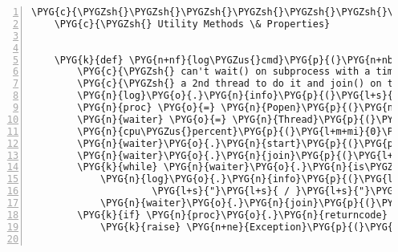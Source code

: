 \begin{Verbatim}[commandchars=\\\{\},numbers=left,firstnumber=1,stepnumber=5]
    \PYG{c}{\PYGZsh{}\PYGZsh{}\PYGZsh{}\PYGZsh{}\PYGZsh{}\PYGZsh{}\PYGZsh{}\PYGZsh{}\PYGZsh{}\PYGZsh{}\PYGZsh{}\PYGZsh{}\PYGZsh{}\PYGZsh{}\PYGZsh{}\PYGZsh{}\PYGZsh{}\PYGZsh{}\PYGZsh{}\PYGZsh{}\PYGZsh{}\PYGZsh{}\PYGZsh{}\PYGZsh{}\PYGZsh{}\PYGZsh{}\PYGZsh{}\PYGZsh{}\PYGZsh{}\PYGZsh{}\PYGZsh{}\PYGZsh{}\PYGZsh{}\PYGZsh{}\PYGZsh{}\PYGZsh{}\PYGZsh{}\PYGZsh{}\PYGZsh{}\PYGZsh{}\PYGZsh{}\PYGZsh{}\PYGZsh{}\PYGZsh{}\PYGZsh{}\PYGZsh{}\PYGZsh{}\PYGZsh{}\PYGZsh{}\PYGZsh{}\PYGZsh{}\PYGZsh{}\PYGZsh{}\PYGZsh{}\PYGZsh{}\PYGZsh{}\PYGZsh{}\PYGZsh{}\PYGZsh{}\PYGZsh{}\PYGZsh{}\PYGZsh{}\PYGZsh{}\PYGZsh{}\PYGZsh{}\PYGZsh{}\PYGZsh{}\PYGZsh{}\PYGZsh{}\PYGZsh{}\PYGZsh{}\PYGZsh{}\PYGZsh{}\PYGZsh{}\PYGZsh{}\PYGZsh{}}
    \PYG{c}{\PYGZsh{} Utility Methods \& Properties}


    \PYG{k}{def} \PYG{n+nf}{log\PYGZus{}cmd}\PYG{p}{(}\PYG{n+nb+bp}{self}\PYG{p}{,} \PYG{o}{*}\PYG{n}{cmd}\PYG{p}{)}\PYG{p}{:}
        \PYG{c}{\PYGZsh{} can't wait() on subprocess with a timeout, alas start up}
        \PYG{c}{\PYGZsh{} a 2nd thread to do it and join() on that one with a timeout}
        \PYG{n}{log}\PYG{o}{.}\PYG{n}{info}\PYG{p}{(}\PYG{l+s}{"}\PYG{l+s}{forking subprocess: \PYGZdl{} }\PYG{l+s+si}{\PYGZpc{}s}\PYG{l+s}{"} \PYG{o}{\PYGZpc{}} \PYG{l+s}{'}\PYG{l+s}{ }\PYG{l+s}{'}\PYG{o}{.}\PYG{n}{join}\PYG{p}{(}\PYG{n+nb}{map}\PYG{p}{(}\PYG{n+nb}{repr}\PYG{p}{,} \PYG{n}{cmd}\PYG{p}{)}\PYG{p}{)}\PYG{p}{)}
        \PYG{n}{proc} \PYG{o}{=} \PYG{n}{Popen}\PYG{p}{(}\PYG{n}{cmd}\PYG{p}{,} \PYG{n}{stdout}\PYG{o}{=}\PYG{n+nb+bp}{self}\PYG{o}{.}\PYG{n}{logfile}\PYG{p}{,} \PYG{n}{stderr}\PYG{o}{=}\PYG{n+nb+bp}{self}\PYG{o}{.}\PYG{n}{logfile}\PYG{p}{)}
        \PYG{n}{waiter} \PYG{o}{=} \PYG{n}{Thread}\PYG{p}{(}\PYG{n}{target}\PYG{o}{=}\PYG{n}{proc}\PYG{o}{.}\PYG{n}{wait}\PYG{p}{)}
        \PYG{n}{cpu\PYGZus{}percent}\PYG{p}{(}\PYG{l+m+mi}{0}\PYG{p}{,} \PYG{n+nb+bp}{True}\PYG{p}{)}
        \PYG{n}{waiter}\PYG{o}{.}\PYG{n}{start}\PYG{p}{(}\PYG{p}{)}
        \PYG{n}{waiter}\PYG{o}{.}\PYG{n}{join}\PYG{p}{(}\PYG{l+m+mi}{15}\PYG{p}{)}
        \PYG{k}{while} \PYG{n}{waiter}\PYG{o}{.}\PYG{n}{is\PYGZus{}alive}\PYG{p}{(}\PYG{p}{)}\PYG{p}{:}
            \PYG{n}{log}\PYG{o}{.}\PYG{n}{info}\PYG{p}{(}\PYG{l+s}{"}\PYG{l+s}{subprocess still running - system load: }\PYG{l+s}{"} \PYG{o}{+}
                     \PYG{l+s}{"}\PYG{l+s}{ / }\PYG{l+s}{"}\PYG{o}{.}\PYG{n}{join}\PYG{p}{(}\PYG{p}{(}\PYG{l+s}{"}\PYG{l+s+si}{\PYGZpc{}d}\PYG{l+s+si}{\PYGZpc{}\PYGZpc{}}\PYG{l+s}{"} \PYG{o}{\PYGZpc{}} \PYG{n}{p} \PYG{k}{for} \PYG{n}{p} \PYG{o+ow}{in} \PYG{n}{cpu\PYGZus{}percent}\PYG{p}{(}\PYG{l+m+mi}{0}\PYG{p}{,} \PYG{n+nb+bp}{True}\PYG{p}{)}\PYG{p}{)}\PYG{p}{)}\PYG{p}{)}
            \PYG{n}{waiter}\PYG{o}{.}\PYG{n}{join}\PYG{p}{(}\PYG{l+m+mi}{15}\PYG{p}{)}
        \PYG{k}{if} \PYG{n}{proc}\PYG{o}{.}\PYG{n}{returncode} \PYG{o}{!=} \PYG{l+m+mi}{0}\PYG{p}{:}
            \PYG{k}{raise} \PYG{n+ne}{Exception}\PYG{p}{(}\PYG{l+s}{"}\PYG{l+s+si}{\PYGZpc{}s}\PYG{l+s}{ failed}\PYG{l+s}{"} \PYG{o}{\PYGZpc{}} \PYG{p}{(}\PYG{n}{cmd}\PYG{p}{,}\PYG{p}{)}\PYG{p}{)}


\end{Verbatim}
